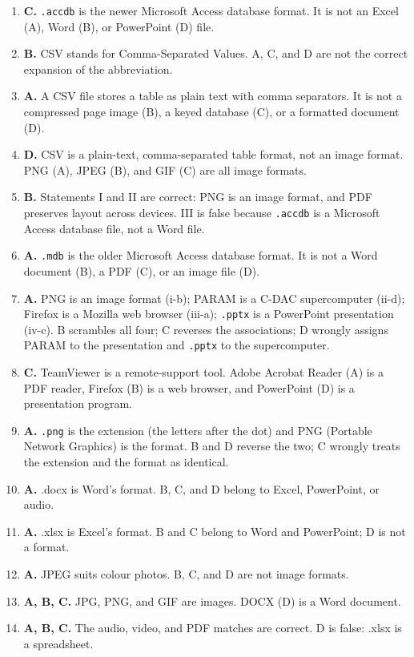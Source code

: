 \documentclass[11pt]{article}
\begin{document}
\begin{enumerate}[label=\textbf{Q\arabic*.}, leftmargin=*]
  Excel, \texttt{.pptx} (C) is PowerPoint, and \texttt{.txt} (D) is plain
  text.
\item \textbf{C.} \texttt{.accdb} is the newer Microsoft Access database
  format. It is not an Excel (A), Word (B), or PowerPoint (D) file.
\item \textbf{B.} CSV stands for Comma-Separated Values. A, C, and D are not
  the correct expansion of the abbreviation.
\item \textbf{A.} A CSV file stores a table as plain text with comma
  separators. It is not a compressed page image (B), a keyed database (C), or
  a formatted document (D).
\item \textbf{D.} CSV is a plain-text, comma-separated table format, not an
  image format. PNG (A), JPEG (B), and GIF (C) are all image formats.
\item \textbf{B.} Statements I and II are correct: PNG is an image format,
  and PDF preserves layout across devices. III is false because
  \texttt{.accdb} is a Microsoft Access database file, not a Word file.
\item \textbf{A.} \texttt{.mdb} is the older Microsoft Access database
  format. It is not a Word document (B), a PDF (C), or an image file (D).
\item \textbf{A.} PNG is an image format (i-b); PARAM is a C-DAC supercomputer
  (ii-d); Firefox is a Mozilla web browser (iii-a); \texttt{.pptx} is a
  PowerPoint presentation (iv-c). B scrambles all four; C reverses the
  associations; D wrongly assigns PARAM to the presentation and
  \texttt{.pptx} to the supercomputer.
\item \textbf{C.} TeamViewer is a remote-support tool. Adobe Acrobat Reader
  (A) is a PDF reader, Firefox (B) is a web browser, and PowerPoint (D) is a
  presentation program.
\item \textbf{A.} \texttt{.png} is the extension (the letters after the dot)
  and PNG (Portable Network Graphics) is the format. B and D reverse the two;
  C wrongly treats the extension and the format as identical.

\item \textbf{A.} .docx is Word's format. B, C, and D belong to Excel, PowerPoint, or audio.
\item \textbf{A.} .xlsx is Excel's format. B and C belong to Word and PowerPoint; D is not a format.
\item \textbf{A.} JPEG suits colour photos. B, C, and D are not image formats.
\item \textbf{A, B, C.} JPG, PNG, and GIF are images. DOCX (D) is a Word document.
\item \textbf{A, B, C.} The audio, video, and PDF matches are correct. D is false: .xlsx is a spreadsheet.
\end{enumerate}
\def\JKSSBLessonID{55}\def\JKSSBAnswers{1}
\end{document}
